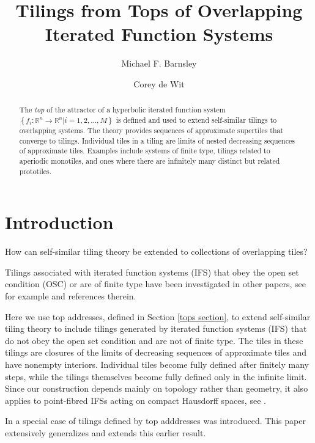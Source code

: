 \documentclass{amsproc}%
\theoremstyle{plain}
\theoremstyle{definition}
\numberwithin{equation}{section}
\begin{document}
\title{Tilings from Tops of Overlapping Iterated Function Systems}
\author[M. F. Barnsley]{Michael F. Barnsley}
\author[C. de Wit]{Corey de Wit}

\begin{abstract}
The \textit{top} of the attractor of a hyperbolic iterated function system
$\left\{  f_{i}:\mathbb{R}^{n}\rightarrow\mathbb{R}^{n}|i=1,2,\dots,M\right\}
$ is defined and used to extend self-similar tilings to overlapping systems.
The theory provides sequences of approximate supertiles that converge to
tilings. Individual tiles in a tiling are limits of nested decreasing
sequences of approximate tiles. Examples include systems of finite type,
tilings related to aperiodic monotiles, and ones where there are infinitely
many distinct but related prototiles.

\end{abstract}
\dedicatory{ }\maketitle


\section{Introduction}

How can self-similar tiling theory \cite{bandt0, kenyon} be extended to
collections of overlapping tiles?

Tilings associated with iterated function systems (IFS) that obey the open set
condition (OSC) or are of finite type have been investigated in other papers,
see for example \cite{bandt2, bandt3, tilings, gdifs} and references therein.

Here we use top addresses, defined in Section \ref{tops section}, to extend
self-similar tiling theory to include tilings generated by iterated function
systems (IFS) that do not obey the open set condition and are not of finite
type. The tiles in these tilings are closures of the limits of decreasing
sequences of approximate tiles and have nonempty interiors. Individual tiles
become fully defined after finitely many steps, while the tilings themselves
become fully defined only in the infinite limit. Since our construction
depends mainly on topology rather than geometry, it also applies to
point-fibred IFSs acting on compact Hausdorff spaces, see \cite{tilings,
kieninger}.

In \cite{BB} a special case of tilings defined by top adddresses was
introduced. This paper extensively generalizes and extends this earlier result.
\end{document}
